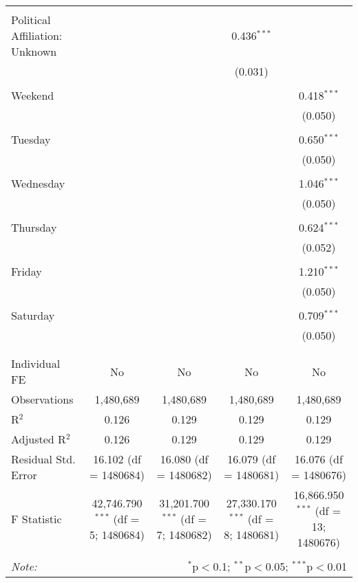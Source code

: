 \documentclass[
]{article}
\begin{document}
\begin{table}[!htbp]
{\begin{tabular}{@{\extracolsep{5pt}}lcccc}
  & & & & \\ 
 Political Affiliation: Unknown &  &  & 0.436$^{***}$ &  \\ 
  &  &  & (0.031) &  \\ 
  & & & & \\ 
 Weekend &  &  &  & 0.418$^{***}$ \\ 
  &  &  &  & (0.050) \\ 
  & & & & \\ 
 Tuesday &  &  &  & 0.650$^{***}$ \\ 
  &  &  &  & (0.050) \\ 
  & & & & \\ 
 Wednesday &  &  &  & 1.046$^{***}$ \\ 
  &  &  &  & (0.050) \\ 
  & & & & \\ 
 Thursday &  &  &  & 0.624$^{***}$ \\ 
  &  &  &  & (0.052) \\ 
  & & & & \\ 
 Friday &  &  &  & 1.210$^{***}$ \\ 
  &  &  &  & (0.050) \\ 
  & & & & \\ 
 Saturday &  &  &  & 0.709$^{***}$ \\ 
  &  &  &  & (0.050) \\ 
  & & & & \\ 
\hline \\[-1.8ex] 
Individual FE & No & No & No & No \\ 
Observations & 1,480,689 & 1,480,689 & 1,480,689 & 1,480,689 \\ 
R$^{2}$ & 0.126 & 0.129 & 0.129 & 0.129 \\ 
Adjusted R$^{2}$ & 0.126 & 0.129 & 0.129 & 0.129 \\ 
Residual Std. Error & 16.102 (df = 1480684) & 16.080 (df = 1480682) & 16.079 (df = 1480681) & 16.076 (df = 1480676) \\ 
F Statistic & 42,746.790$^{***}$ (df = 5; 1480684) & 31,201.700$^{***}$ (df = 7; 1480682) & 27,330.170$^{***}$ (df = 8; 1480681) & 16,866.950$^{***}$ (df = 13; 1480676) \\ 
\hline 
\hline \\[-1.8ex] 
\textit{Note:}  & \multicolumn{4}{r}{$^{*}$p$<$0.1; $^{**}$p$<$0.05; $^{***}$p$<$0.01} \\ 
\end{tabular}
} 
\end{table} 
\newpage
\end{document}
